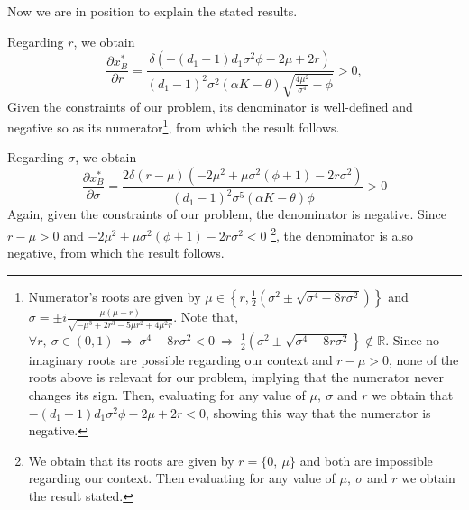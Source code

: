 Now we are in position to explain the stated results.

Regarding $r$, we obtain
$$\frac{\partial x^*_B}{\partial r}=\frac{\delta  \left(-(d_1-1) d_1 \sigma ^2 \phi-2 \mu +2 r \right)}{(d_1-1)^2 \sigma ^2 (\alpha  K-\theta ) \sqrt{\frac{4 \mu ^2}{\sigma ^4}-\phi}}>0,$$
Given the constraints of our problem, its denominator is well-defined and negative so as its numerator\footnote{Numerator's roots are given by $\mu \in \left\{r, \frac{1}{2}\left(\sigma ^2\pm\sqrt{\sigma ^4-8 r \sigma ^2}\right) \right\}$ and $\sigma = \pm i \frac{ \mu  (\mu -r)}{\sqrt{-\mu ^3+2 r^3-5 \mu  r^2+4 \mu ^2 r}}$. Note that,\\
$\forall r, \ \sigma \in (0,1) \ \Rightarrow \ \sigma ^4-8 r \sigma ^2<0 \ \Rightarrow \ \frac{1}{2}\left(\sigma ^2\pm\sqrt{\sigma ^4-8 r \sigma ^2}\right \} \notin \mathds{R}.$ 
Since no imaginary roots are possible regarding our context and $r-\mu>0$, none of the roots above is relevant for our problem, implying that the numerator never changes its sign. Then, evaluating for any value of $\mu, \ \sigma$ and $r$ we obtain that $-(d_1-1) d_1 \sigma ^2 \phi-2 \mu +2 r <0$, showing this way that the numerator is negative. },
from which the result follows.


Regarding $\sigma$, we obtain
\begin{equation}
\frac{\partial x^*_B}{\partial \sigma}=\frac{2 \delta  (r-\mu) \left(-2 \mu ^2+\mu  \sigma ^2 \left(\phi+1\right)-2 r \sigma ^2\right)}{(d_1-1)^2 \sigma ^5 (\alpha  K-\theta ) \phi}>0
\label{1_xBs}
\end{equation}
Again, given the constraints of our problem, the denominator is negative.
Since $r-\mu>0$ and $-2 \mu ^2+\mu  \sigma ^2 \left(\phi+1\right)-2 r \sigma ^2<0$
\footnote{We obtain that its roots are given by $r=\{0, \ \mu \}$ and both are impossible regarding our context. Then evaluating for any value of $\mu, \ \sigma$ and $r$ we obtain the result stated.}, the denominator is also negative, from which the result follows.




